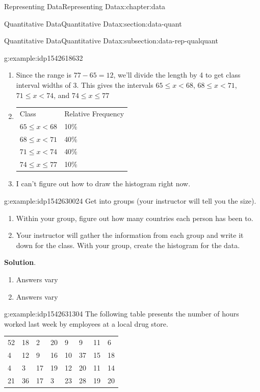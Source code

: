 \documentclass[oneside,10pt,]{book}
\newcommand{\blocktitlefont}{\relax}
\newcommand{\tabularfont}{\relax}
\newcommand{\lt}{<}
\begin{document}
\begin{chapterptx}{Representing Data}{}{Representing Data}{}{}{x:chapter:data}
\begin{sectionptx}{Quantitative Data}{}{Quantitative Data}{}{}{x:section:data-quant}
\begin{subsectionptx}{Quantitative Data}{}{Quantitative Data}{}{}{x:subsection:data-rep-qualquant}
\begin{example}{}{g:example:idp1542618632}
\begin{enumerate}[label=\alph*]
\item{}Since the range is \(77-65=12\), we'll divide the length by 4 to get class interval widths of 3.  This gives the intervals \(65\leq x \lt 68\), \(68\leq x \lt 71\), \(71\leq x \lt 74\), and \(74\leq x \leq 77\)%
\item{}\begin{center}%
{\tabularfont%
\begin{tabular}{ll}
Class&Relative Frequency\tabularnewline[0pt]
\(65\leq x \lt 68\)&10\%\tabularnewline[0pt]
\(68\leq x \lt 71\)&40\%\tabularnewline[0pt]
\(71\leq x \lt 74\)&40\%\tabularnewline[0pt]
\(74\leq x \leq 77\)&10\%
\end{tabular}
}%
\end{center}%
%
\item{}I can't figure out how to draw the histogram right now.%
\end{enumerate}
%
\end{example}
\begin{example}{}{g:example:idp1542630024}%
Get into groups (your instructor will tell you the size).%
\par
%
\begin{enumerate}[label=\alph*]
\item{}Within your group, figure out how many countries each person has been to.%
\item{}Your instructor will gather the information from each group and write it down for the class.  With your group, create the histogram for the data.%
\end{enumerate}
%
\par\smallskip%
\noindent\textbf{\blocktitlefont Solution}.\hypertarget{g:solution:idp1542636296}{}\quad{}%
\begin{enumerate}[label=\alph*]
\item{}Answers vary%
\item{}Answers vary%
\end{enumerate}
%
\end{example}
\begin{example}{}{g:example:idp1542631304}%
The following table presents the number of hours worked last week by employees at a local drug store. \begin{center}%
{\tabularfont%
\begin{tabular}{llllllll}
52&18&2&20&9&9&11&6\tabularnewline[0pt]
4&12&9&16&10&37&15&18\tabularnewline[0pt]
4&3&17&19&12&20&11&14\tabularnewline[0pt]
21&36&17&3&23&28&19&20

\end{tabular}}
\end{center}
\end{example}
\end{subsectionptx}
\end{sectionptx}
\end{chapterptx}
\end{document}
